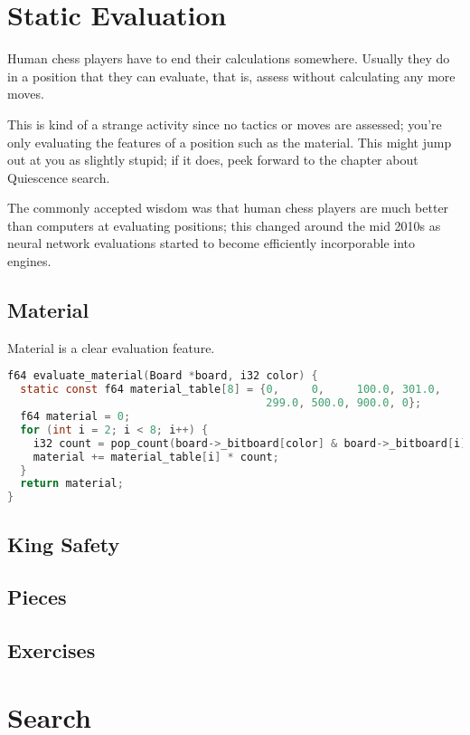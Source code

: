\documentclass[letterpaper,11pt]{article}
\begin{document}
\section{Static Evaluation}

Human chess players have to end their calculations somewhere. Usually they do in a position 
that they can evaluate, that is, assess without calculating any more moves.

This is kind of a strange activity since no tactics or moves are assessed; you're only 
evaluating the features of a position such as the material. This might jump out at you as 
slightly stupid; if it does, peek forward to the chapter about Quiescence search.

The commonly accepted wisdom was that human chess players are
much better than computers at evaluating positions;
this changed around the mid 2010s as neural network evaluations started to become 
efficiently incorporable into engines. 

\subsection{Material}

Material is a clear evaluation feature.
\begin{lstlisting}[language=C]
f64 evaluate_material(Board *board, i32 color) {
  static const f64 material_table[8] = {0,     0,     100.0, 301.0,
                                        299.0, 500.0, 900.0, 0};
  f64 material = 0;
  for (int i = 2; i < 8; i++) {
    i32 count = pop_count(board->_bitboard[color] & board->_bitboard[i]);
    material += material_table[i] * count;
  }
  return material;
}
\end{lstlisting}
\subsection{King Safety}



\subsection{Pieces}
\subsection{Exercises}

\section{Search}
\end{document}
